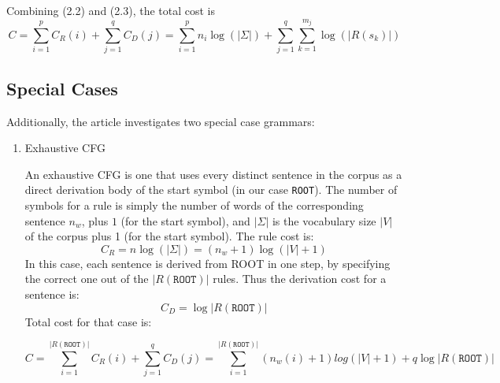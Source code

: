 \documentclass[paper=a4, fontsize=11pt]{scrartcl} %
\numberwithin{equation}{section} %
\numberwithin{figure}{section} %
\numberwithin{table}{section} %
\begin{document}
Combining (2.2) and (2.3), the total cost is
\begin{equation}\label{first}
C = \sum \limits_{i=1}^p C_R(i) + \sum\limits_{j=1}^q C_D(j) = \sum \limits_{i=1}^p n_i \log(\lvert \Sigma \rvert) + \sum\limits_{j=1}^q \sum\limits_{k=1}^{m_j} \log(\lvert R(s_k) \rvert)
\end{equation}

\subsection{Special Cases}
Additionally, the article investigates two special case grammars:
\begin{enumerate}[1.]
\item Exhaustive CFG

An exhaustive CFG is one that uses every distinct sentence in the corpus as a direct derivation body of the start symbol (in our case \texttt{ROOT}). The number of symbols for a rule is simply the number of words of the corresponding sentence \begin{math} n_w \end{math}, plus $1$ (for the start symbol), and \begin{math} \lvert \Sigma \rvert \end{math} is the vocabulary size \begin{math} \lvert V \rvert \end{math} of the corpus plus 1 (for the start symbol). The rule cost is:
\begin{equation}\label{first}
C_R = n \log(\lvert \Sigma \rvert) = (n_w + 1) \log(\lvert V \rvert + 1)
\end{equation}
In this case, each sentence is derived from ROOT in one step, by specifying the correct one out of the \begin{math} \lvert R(\texttt{ROOT}) \rvert \end{math} rules. Thus the derivation cost for a sentence is:
\begin{equation}\label{first}
C_D = \log \lvert R(\texttt{ROOT}) \rvert
\end{equation}
 Total cost for that case is:

\begin{equation}\label{first}
C = \sum \limits_{i=1}^{\lvert R(\texttt{ROOT}) \rvert} C_R(i) + \sum \limits_{j=1}^q C_D(j) = \sum \limits_{i=1}^{\lvert R(\texttt{ROOT}) \rvert} (n_w(i) + 1) log(\lvert V \rvert + 1) + q \log \lvert R(\texttt{ROOT}) \rvert
\end{equation}


\end{enumerate}
\end{document}
